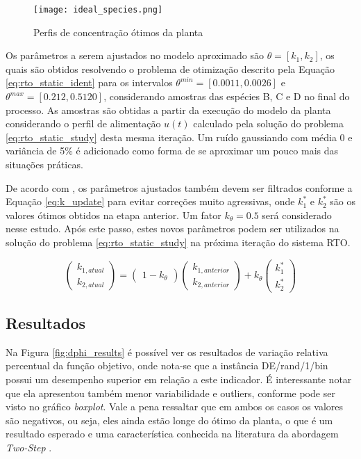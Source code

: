 \documentclass[conference]{IEEEtran}
\begin{document}
\begin{figure}[htb]
	\centering
	\texttt{[image: ideal\_species.png]}
	\caption{Perfis de concentração ótimos da planta}
	\label{fig:ideal_species}
\end{figure}


Os parâmetros a serem ajustados no modelo aproximado são $\theta = [k_1, k_2]$, os quais são obtidos resolvendo o problema de otimização descrito pela Equação \ref{eq:rto_static_ident} para os intervalos $\theta^{min} = [0.0011, 0.0026]$ e $\theta^{max} = [0.212, 0.5120]$, considerando amostras das espécies B, C e D no final do processo. As amostras são obtidas a partir da execução do modelo da planta considerando o perfil de alimentação $u(t)$ calculado pela solução do problema \ref{eq:rto_static_study} desta mesma iteração. Um ruído gaussiando com média 0 e variância de 5\% é adicionado como forma de se aproximar um pouco mais das situações práticas.

De acordo com \cite{chachuat2009adaptation}, os parâmetros ajustados também devem ser filtrados conforme a Equação \ref{eq:k_update} para evitar correções muito agressivas, onde $k_1^*$ e $k_{2}^*$ são os valores ótimos obtidos na etapa anterior. Um fator $k_{\theta} = 0.5$ será considerado nesse estudo. Após este passo, estes novos parâmetros podem ser utilizados na solução do problema \ref{eq:rto_static_study} na próxima iteração do sistema RTO.


\begin{equation}
\begin{pmatrix}
	k_{1,atual}\\ k_{2,atual} 
\end{pmatrix}
=
\begin{pmatrix}
	1 - k_{\theta}
\end{pmatrix}
\begin{pmatrix}
	k_{1,anterior}\\ k_{2,anterior} 
\end{pmatrix}
+
k_{\theta}
\begin{pmatrix}
	k_1^*\\ k_{2}^* 
\end{pmatrix}
\label{eq:k_update}
\end{equation}

\subsection{Resultados}

Na Figura \ref{fig:dphi_results} é possível ver os resultados de variação relativa percentual da função objetivo, onde nota-se que a instância DE/rand/1/bin possui um desempenho superior em relação a este indicador. É interessante notar que ela apresentou também menor variabilidade e outliers, conforme pode ser visto no gráfico \textit{boxplot}. Vale a pena ressaltar que em ambos os casos os valores são negativos, ou seja, eles ainda estão longe do ótimo da planta, o que é um resultado esperado e uma característica conhecida na literatura da abordagem \textit{Two-Step} \cite{srinivasan2019110th}.
\end{document}
